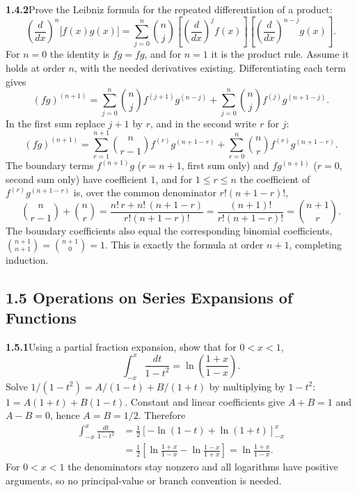\par\bigskip
\noindent\textbf{1.4.2}\quad Prove the Leibniz formula for the repeated
differentiation of a product:
\[
\left(\frac{d}{dx}\right)^{n}\bigl[f(x)g(x)\bigr]
=\sum_{j=0}^{n}\binom{n}{j}\left[\left(\frac{d}{dx}\right)^{j}f(x)\right]
\left[\left(\frac{d}{dx}\right)^{n-j}g(x)\right].
\]
\solution
For $n=0$ the identity is $fg=fg$, and for $n=1$ it is the product
rule. Assume it holds at order $n$, with the needed derivatives existing.
Differentiating each term gives
\[
 (fg)^{(n+1)}
 =\sum_{j=0}^n\binom nj f^{(j+1)}g^{(n-j)}
  +\sum_{j=0}^n\binom nj f^{(j)}g^{(n+1-j)}.
\]
In the first sum replace $j+1$ by $r$, and in the second write $r$ for
$j$:
\[
 (fg)^{(n+1)}
 =\sum_{r=1}^{n+1}\binom n{r-1}f^{(r)}g^{(n+1-r)}
  +\sum_{r=0}^n\binom nr f^{(r)}g^{(n+1-r)}.
\]
The boundary terms $f^{(n+1)}g$ ($r=n+1$, first sum only) and
$fg^{(n+1)}$ ($r=0$, second sum only) have coefficient $1$, and for
$1\le r\le n$ the coefficient of $f^{(r)}g^{(n+1-r)}$ is, over the
common denominator $r!(n+1-r)!$,
\[
 \binom n{r-1}+\binom nr
 =\frac{n!\,r+n!\,(n+1-r)}{r!(n+1-r)!}
 =\frac{(n+1)!}{r!(n+1-r)!}=\binom{n+1}r.
\]
The boundary coefficients also equal the corresponding binomial
coefficients, $\binom{n+1}{n+1}=\binom{n+1}0=1$. This is exactly the
formula at order $n+1$, completing induction.


\subsection*{1.5 Operations on Series Expansions of Functions}

\par\bigskip
\noindent\textbf{1.5.1}\quad Using a partial fraction expansion, show that for
$0<x<1$,
\[
\int_{-x}^{x}\frac{dt}{1-t^{2}}=\ln\left(\frac{1+x}{1-x}\right).
\]
\solution
Solve $1/(1-t^2)=A/(1-t)+B/(1+t)$ by multiplying by $1-t^2$:
$1=A(1+t)+B(1-t)$. Constant and linear coefficients give
$A+B=1$ and $A-B=0$, hence $A=B=1/2$. Therefore
\[
 \begin{aligned}
 \int_{-x}^x\frac{dt}{1-t^2}
 &=\frac12[-\ln(1-t)+\ln(1+t)]_{-x}^x\\
 &=\frac12\left[\ln\frac{1+x}{1-x}-\ln\frac{1-x}{1+x}\right]
 =\ln\frac{1+x}{1-x}.
 \end{aligned}
\]
For $0<x<1$ the denominators stay nonzero and all logarithms have
positive arguments, so no principal-value or branch convention is needed.


